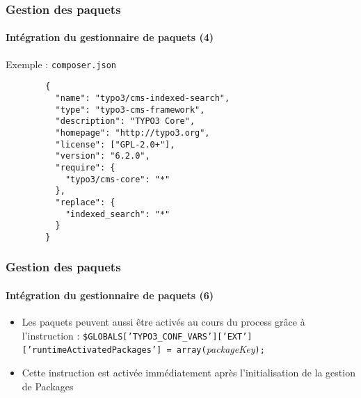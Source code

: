 
\begin{frame}[fragile]
	\frametitle{Gestion des paquets}
	\framesubtitle{Intégration du gestionnaire de paquets (4)}

	Exemple : \texttt{composer.json}

	\lstset{
		basicstyle=\tiny\ttfamily
	}

	\begin{lstlisting}
		{
		  "name": "typo3/cms-indexed-search",
		  "type": "typo3-cms-framework",
		  "description": "TYPO3 Core",
		  "homepage": "http://typo3.org",
		  "license": ["GPL-2.0+"],
		  "version": "6.2.0",
		  "require": {
		    "typo3/cms-core": "*"
		  },
		  "replace": {
		    "indexed_search": "*"
		  }
		}
	\end{lstlisting}

\end{frame}



\begin{frame}[fragile]
	\frametitle{Gestion des paquets}
	\framesubtitle{Intégration du gestionnaire de paquets (6)}

	\lstset{
		basicstyle=\smaller\ttfamily
	}

	\begin{itemize}
		\item Les paquets peuvent aussi être activés au cours du process grâce à l'instruction :
			\smaller\texttt{\$GLOBALS['TYPO3\_CONF\_VARS']['EXT']['runtimeActivatedPackages'] = array(}\space\textit{packageKey}\space\texttt{);}\normalsize

		\item Cette instruction est activée immédiatement après l'initialisation de la gestion de Packages

	\end{itemize}

\end{frame}

